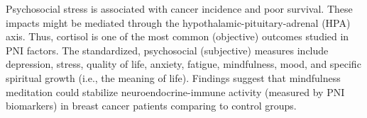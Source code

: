 \documentclass[12pt, a4paper]{article}
\begin{document}
Psychosocial stress is associated with cancer incidence and poor survival\citep{Chida2008}.
These impacts might be mediated through the hypothalamic-pituitary-adrenal (HPA) axis\citep{Hsiao2012}.
Thus, cortisol is one of the most common (objective) outcomes studied in PNI factors. %
The standardized, psychosocial (subjective) measures include depression, stress, quality of life, anxiety, fatigue, mindfulness, mood, and specific spiritual growth (i.e., the meaning of life)\citep{Hsiao2012}. %
Findings suggest that mindfulness meditation could stabilize neuroendocrine-immune activity (measured by PNI biomarkers) in breast cancer patients comparing to control groups\citep{Hulett2016}.
\end{document}

